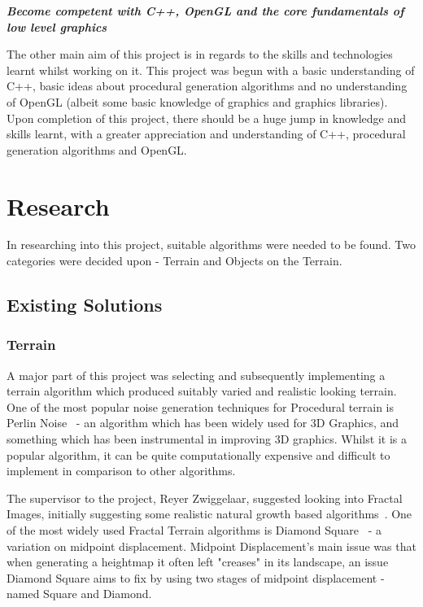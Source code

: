 \documentclass[a4paper,10pt]{report}
\begin{document}
\textbf{\textit{Become competent with C++, OpenGL and the core fundamentals of low level graphics}} \medskip

The other main aim of this project is in regards to the skills and technologies learnt whilst working on it. This project was begun with a basic understanding of C++, basic ideas about procedural generation algorithms and no understanding of OpenGL (albeit some basic knowledge of graphics and graphics libraries). Upon completion of this project, there should be a huge jump in knowledge and skills learnt, with a greater appreciation and understanding of C++, procedural generation algorithms and OpenGL.\medskip

\chapter{Research}

In researching into this project, suitable algorithms were needed to be found. Two categories were decided upon - Terrain and Objects on the Terrain. \medskip

\section{Existing Solutions}

\subsection{Terrain}

A major part of this project was selecting and subsequently implementing a terrain algorithm which produced suitably varied and realistic looking terrain. One of the most popular noise generation techniques for Procedural terrain is Perlin Noise~\cite{perlin2002improving} - an algorithm which has been widely used for 3D Graphics, and something which has been instrumental in improving 3D graphics. Whilst it is a popular algorithm, it can be quite computationally expensive and difficult to implement in comparison to other algorithms.\medskip

The supervisor to the project, Reyer Zwiggelaar, suggested looking into Fractal Images, initially suggesting some realistic natural growth based algorithms~\cite{Bilsborough3424}. One of the most widely used Fractal Terrain algorithms is Diamond Square~\cite{olsen2004realtime} - a variation on midpoint displacement. Midpoint Displacement's main issue was that when generating a heightmap it often left "creases" in its landscape, an issue Diamond Square aims to fix by using two stages of midpoint displacement - named Square and Diamond.  \medskip
\end{document}
